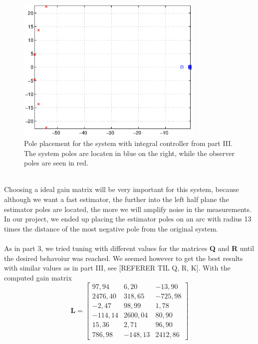 \begin{figure}[htb]
	\centering
		\includegraphics[width=0.8\textwidth]{figures/Pole_placement_P4p2_integral.eps}
	\caption{Pole placement for the system with integral controller from part III. The system poles are locaten in blue on the right, while the observer poles are seen in red.}
\label{fig:Pole_placement_P4p2}
\end{figure}
\\

Choosing a ideal gain matrix will be very important for this system, because although we want a fast estimator, the further into the left half plane the estimator poles are located, the more we will amplify noise in the measurements. In our project, we ended up placing the estimator poles on an arc with radius 13 times the distance of the most negative pole from the original system.\\
\\As in part 3, we tried tuning with different values for the matrices \textbf{Q} and \textbf{R} until the desired behavoiur was reached. We seemed however to get the best results with similar values as in part III, see [REFERER TIL Q, R, K]. With the computed gain matrix
\begin{equation}\label{eq:L_P4p2}
\mathbf{L} = \begin{bmatrix}
97,94 & 6,20 & -13,90\\
2476,40 & 318,65 & -725,98\\
-2,47 & 98,99 &	1,78\\
-114,14 & 2600,04 &	80,90\\
15,36 & 2,71 & 96,90\\
786,98 & -148,13 & 2412,86
\end{bmatrix}
\end{equation}

